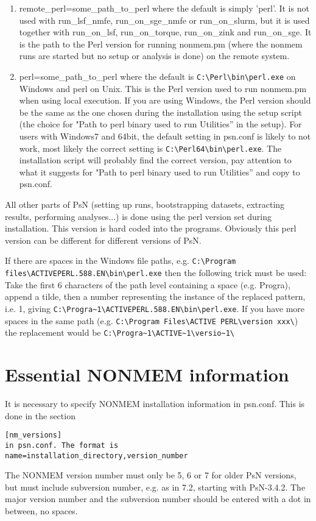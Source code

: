 \documentclass[a4paper,12pt]{article}
\begin{document}
\begin{enumerate}
		\item remote\_perl=some\_path\_to\_perl
where the default is simply 'perl'. It is not used with run\_lsf\_nmfe, run\_on\_sge\_nmfe or run\_on\_slurm, but it is used together with run\_on\_lsf, run\_on\_torque, run\_on\_zink and run\_on\_sge. It is the path to the Perl version for running nonmem.pm (where the nonmem runs are started but no setup or analysis is done) on the remote system.

	\item perl=some\_path\_to\_perl
where the default is \verb|C:\Perl\bin\perl.exe| on Windows and perl on Unix. This is the Perl version used to run nonmem.pm when using local execution. If you are using Windows, the Perl version should be the same as the one chosen during the installation using the setup script (the choice for "Path to perl binary used to run Utilities” in the setup).
For users with Windows7 and 64bit, the default setting in psn.conf is likely to not work, most likely the correct setting is \verb|C:\Perl64\bin\perl.exe|. The installation script will probably find the correct version, pay attention to what it suggests for "Path to perl binary used to run Utilities” and copy to psn.conf. 
\end{enumerate}

All other parts of PsN (setting up runs, bootstrapping datasets, extracting results, performing analyses...) is done using the perl version set during installation. This version is hard 
coded into the programs. Obviously this perl version can be different for different versions of PsN.

If there are spaces in the Windows file paths, e.g.  \verb|C:\Program files\ACTIVEPERL.588.EN\bin\perl.exe| then the following trick must be used: Take the first 6 characters of the path level containing a space (e.g. Progra), append a tilde, then a number representing the instance of the replaced pattern, i.e. 1, giving \verb|C:\Progra~1\ACTIVEPERL.588.EN\bin\perl.exe|. If you have more spaces in the same path (e.g. \verb|C:\Program Files\ACTIVE PERL\version xxx\|) the replacement would be \verb|C:\Progra~1\ACTIVE~1\versio~1\|

\section{Essential NONMEM information}
It is necessary to specify NONMEM installation information in psn.conf. This is done in the section
\begin{verbatim}
[nm_versions]
in psn.conf. The format is 
name=installation_directory,version_number
\end{verbatim}
The NONMEM version number must only be 5, 6 or 7 for older PsN versions, but must include subversion number, e.g. as in 7.2, starting with PsN-3.4.2. The major version number and the subversion number should be entered with a dot in between, no spaces.  
\end{document}
